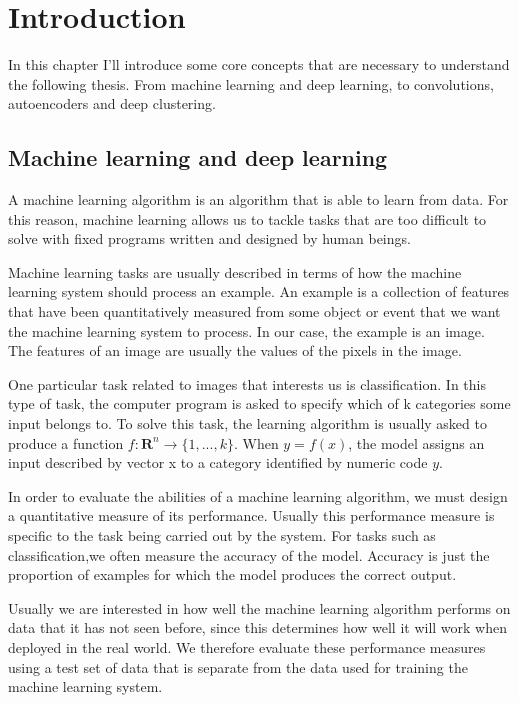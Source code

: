 \chapter{Introduction}

In this chapter I'll introduce some core concepts that are necessary to understand the following thesis. From machine learning and deep learning, to convolutions, autoencoders and deep clustering.  

\section{Machine learning and deep learning}

A machine learning algorithm is an algorithm that is able to learn from data. For this reason, machine learning allows us to tackle tasks that are too diﬃcult to solve with ﬁxed programs written and designed by human beings.

Machine learning tasks are usually described in terms of how the machine learning system should process an example. An example is a collection of features that have been quantitatively measured from some object or event that we want the machine learning system to process. In our case, the example is an image. The features of an image are usually the values of the pixels in the image.

One particular task related to images that interests us is classification. In this type of task, the computer program is asked to specify which of k categories some input belongs to. To solve this task, the learning algorithm is usually asked to produce a function $f: \mathbf{R}^n \rightarrow \{1, ..., k\}$. When
$y = f(x)$, the model assigns an input described by vector x to a category identiﬁed by numeric code $y$.

In order to evaluate the abilities of a machine learning algorithm, we must design a quantitative measure of its performance. Usually this performance measure is specific to the task being carried out by the system. For tasks such as classification,we often measure the accuracy of the model. Accuracy is just the proportion of examples for which the model produces the correct output.

Usually we are interested in how well the machine learning algorithm performs on data that it has not seen before, since this determines how well it will work when deployed in the real world. We therefore evaluate these performance measures using a test set of data that is separate from the data used for training the machine learning system.

